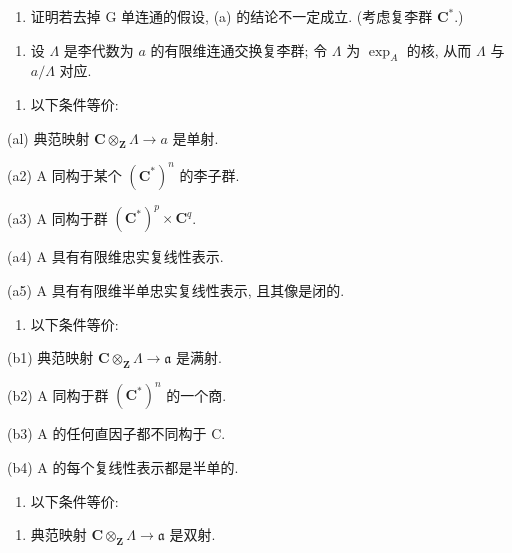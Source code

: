 \begin{enumerate}
\def\labelenumi{(\alph{enumi})}
\setcounter{enumi}{1}
\tightlist
\item
  证明若去掉 G 单连通的假设, (a) 的结论不一定成立. (考虑复李群 \(\mathbf{C}^*\).)
\end{enumerate}

\begin{enumerate}
\def\labelenumi{\arabic{enumi}.}
\setcounter{enumi}{17}
\tightlist
\item
  设 \(\Lambda\) 是李代数为 \(a\) 的有限维连通交换复李群; 令 \(\Lambda\) 为 \(\exp_{A}\) 的核, 从而 \(\Lambda\) 与 \(a / \Lambda\) 对应.
\end{enumerate}

\begin{enumerate}
\def\labelenumi{(\alph{enumi})}
\tightlist
\item
  以下条件等价:
\end{enumerate}

(al) 典范映射 \(\mathbf{C} \otimes_{\mathbf{Z}} \Lambda \to a\) 是单射.

(a2) A 同构于某个 \((\mathbf{C}^{*})^{n}\) 的李子群.

(a3) A 同构于群 \((\mathbf{C}^{*})^{p}\times \mathbf{C}^{q}\).

(a4) A 具有有限维忠实复线性表示.

(a5) A 具有有限维半单忠实复线性表示, 且其像是闭的.

\begin{enumerate}
\def\labelenumi{(\alph{enumi})}
\setcounter{enumi}{1}
\tightlist
\item
  以下条件等价:
\end{enumerate}

(b1) 典范映射 \(\mathbf{C} \otimes_{\mathbf{Z}} \Lambda \to \mathfrak{a}\) 是满射.

(b2) A 同构于群 \((\mathbf{C}^{*})^{n}\) 的一个商.

(b3) A 的任何直因子都不同构于 C.

(b4) A 的每个复线性表示都是半单的.

\begin{enumerate}
\def\labelenumi{(\alph{enumi})}
\setcounter{enumi}{2}
\tightlist
\item
  以下条件等价:
\end{enumerate}

\begin{enumerate}
\def\labelenumi{(\roman{enumi})}
\setcounter{enumi}{149}
\tightlist
\item
  典范映射 \(\mathbf{C} \otimes_{\mathbf{Z}} \Lambda \to \mathfrak{a}\) 是双射.
\end{enumerate}

